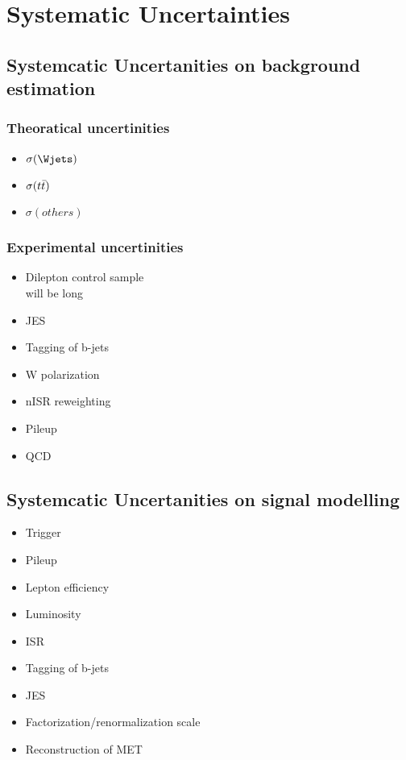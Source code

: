 \chapter{Systematic Uncertainties}
\section{Systemcatic Uncertanities on background estimation}
\subsection{Theoratical uncertinities}
\begin{itemize}
\item $\sigma(\Wjets)$ 
\item $\sigma(t\bar{t})$ 
\item $\sigma(others)$
\end{itemize}
\subsection{Experimental uncertinities}
\begin{itemize}
\item Dilepton control sample \\ 
will be long
\item JES
\item Tagging of b-jets
\item W polarization  
\item nISR reweighting
\item Pileup 
\item QCD
\end{itemize}

\section{Systemcatic Uncertanities on signal modelling}
\begin{itemize}
\item Trigger
\item Pileup
\item Lepton efficiency 
\item Luminosity
\item ISR
\item Tagging of b-jets
\item JES
\item Factorization/renormalization scale
\item Reconstruction of MET 
\end{itemize}
